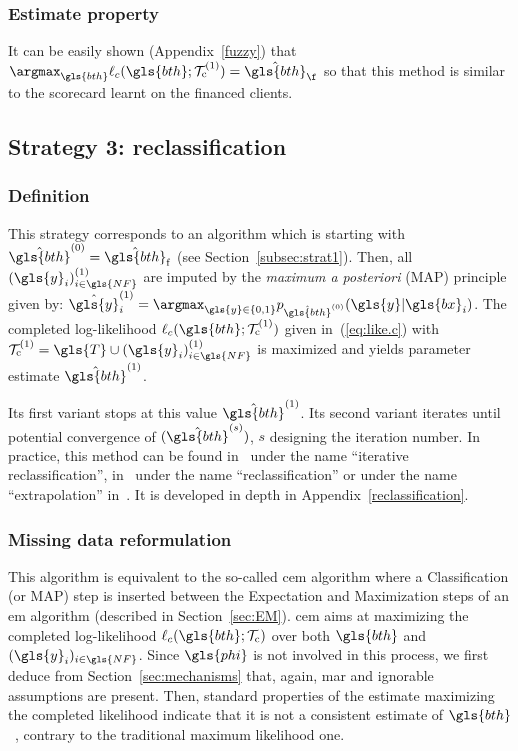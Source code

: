 \subsubsection{Estimate property}
It can be easily shown (Appendix~\ref{fuzzy}) that $\argmax_{\gls{bth}} \ell_c(\gls{bth};\mathcal{T}_{\text{c}}^{(1)}) = \hat{\gls{bth}}_{\f}$ so that this method is similar to the scorecard learnt on the financed clients.

\subsection{Strategy 3: reclassification}

\subsubsection{Definition}
This strategy corresponds to an algorithm which is starting with $\hat{\gls{bth}}^{(0)} = \hat{\gls{bth}}_\text{f}$ (see Section~\ref{subsec:strat1}). Then, all $(\gls{y}_i)^{(1)}_{i \in \gls{NF}}$ are imputed by the {\it maximum a posteriori} (MAP) principle given by: $\hat{\gls{y}}^{(1)}_i = \argmax_{\gls{y} \in \{0,1\}} p_{\hat{\gls{bth}}^{(0)}}(\gls{y} | \gls{bx}_i)$. The completed log-likelihood $\ell_c(\gls{bth};\mathcal{T}_{\text{c}}^{(1)})$ given in~(\ref{eq:like.c}) with $\mathcal{T}_{\text{c}}^{(1)}=\gls{T} \cup (\gls{y}_i)^{(1)}_{i \in \gls{NF}}$ is maximized and yields parameter estimate $\hat{\gls{bth}}^{(1)}$.

Its first variant stops at this value $\hat{\gls{bth}}^{(1)}$. Its second variant iterates until potential convergence of $(\hat{\gls{bth}}^{(s)})$, $s$ designing the iteration number. In practice, this method can be found in~\cite{saporta} under the name ``iterative reclassification'', in~\cite{RI6} under the name ``reclassification'' or under the name ``extrapolation'' in~\cite{banasik}. It is developed in depth in Appendix~\ref{reclassification}.

\subsubsection{Missing data reformulation}
This algorithm is equivalent to the so-called \gls{cem} algorithm where a Classification (or MAP) step is inserted between the Expectation and Maximization steps of an \gls{em} algorithm (described in Section~\ref{sec:EM}).
\gls{cem} aims at maximizing the completed log-likelihood $\ell_c(\gls{bth};\mathcal{T}_{\text{c}})$ over both $\gls{bth}$ and $(\gls{y}_i)_{i \in \gls{NF}}$. Since $\gls{phi}$ is not involved in this process, we first deduce from Section~\ref{sec:mechanisms} that, again, \gls{mar} and ignorable assumptions are present. Then, standard properties of the estimate maximizing the completed likelihood indicate that it is not a consistent estimate of $\gls{bth}$~\cite{celeux1992classification}, contrary to the traditional maximum likelihood one.

